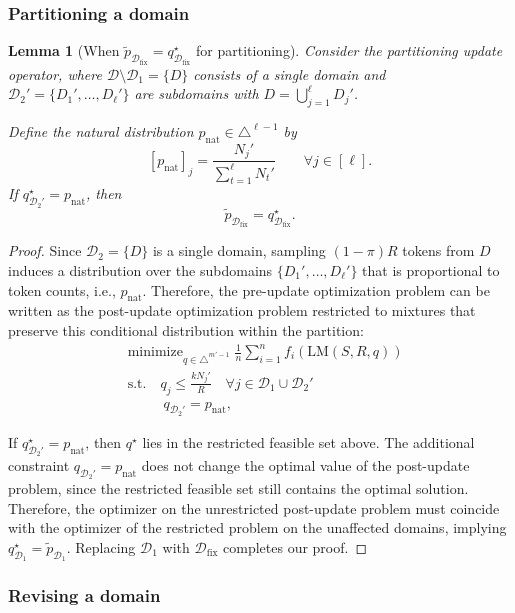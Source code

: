 \documentclass[table]{ai2style/ai2}
\newtheorem{lemma}{Lemma}
\newcommand{\D}[0]{\mathcal{D}}
\newcommand{\LM}[0]{\text{LM}}
\newcommand{\Dfix}[0]{\mathcal{D}_{\text{fix}}}
\begin{document}
\subsubsection{Partitioning a domain}

\begin{lemma}[When $\tilde{p}_{\Dfix} = q^\star_{\Dfix}$ for partitioning]\label{lem:part_exactness}
Consider the \emph{partitioning} update operator, where $\D \setminus \D_1 =\{D\}$ consists of a single domain and
$\D_2'=\{D_1',\dots,D_\ell'\}$ are subdomains with $D=\bigcup_{j=1}^\ell D_j'$.

Define the natural distribution $p_{\mathrm{nat}}\in\triangle^{\ell-1}$ by
\[
[p_{\mathrm{nat}}]_j = \frac{N_j'}{\sum_{t=1}^\ell N_t'} \qquad \forall j\in[\ell].
\]
If $q^\star_{\D_2'} = p_{\mathrm{nat}}$, then
\[
\tilde p_{\Dfix} = q^\star_{\Dfix}.
\]
\end{lemma}

\begin{proof}
Since $\D_2=\{D\}$ is a single domain, sampling $(1-\pi)R$ tokens from $D$ induces a distribution over the subdomains
$\{D_1',\dots,D_\ell'\}$ that is proportional to token counts, i.e., $p_{\mathrm{nat}}$.
Therefore, the pre-update optimization problem can be written as the post-update optimization problem restricted to mixtures that preserve this
conditional distribution within the partition:
\begin{align*}
    &\text{minimize}_{q\in\triangle^{m'-1}} \; \frac{1}{n} \sum_{i = 1}^n f_i(\LM(S, R, q)) \\
    &\text{s.t.}\quad q_j \le \frac{kN_j'}{R}\quad \forall j\in\D_1 \cup\D_2' \\
    &\qquad\;\; q_{\D_2'} = p_{\mathrm{nat}},
\end{align*}

If $q^\star_{\D_2'}=p_{\mathrm{nat}}$, then $q^\star$ lies in the restricted feasible set above. The additional constraint
$q_{\D_2'}=p_{\mathrm{nat}}$ does not change the optimal value of the post-update problem, since the restricted feasible set still contains
the optimal solution. Therefore, the optimizer on the unrestricted post-update problem must coincide with the optimizer of the restricted problem on the
unaffected domains, implying $q^\star_{\D_1}=\tilde p_{\D_1}$. Replacing $\D_1$ with $\Dfix$ completes our proof.
\end{proof}

\subsubsection{Revising a domain}
\end{document}
